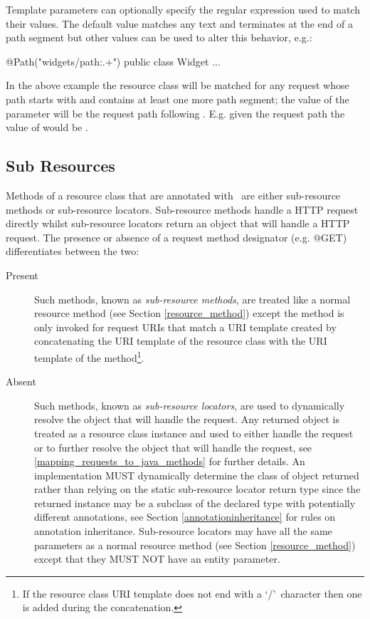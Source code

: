 Template parameters can optionally specify the regular expression used to match their values. The default value matches any text and terminates at the end of a path segment but other values can be used to alter this behavior, e.g.:

\begin{listing}{1}
@Path("widgets/{path:.+}")
public class Widget {
  ...
}\end{listing}

In the above example the  resource class will be matched for any request whose path starts with  and contains at least one more path segment; the value of the  parameter will be the request path following . E.g. given the request path  the value of  would be .

\subsection{Sub Resources}
\label{sub_resources}

Methods of a resource class that are annotated with \Path\ are either sub-resource methods or sub-resource locators. Sub-resource methods handle a HTTP request directly whilst sub-resource locators return an object that will handle a HTTP request. The presence or absence of a request method designator (e.g. @GET) differentiates between the two:

\begin{description}
\item[Present] Such methods, known as {\em sub-resource methods}, are treated like a normal resource method (see Section \ref{resource_method}) except the method is only invoked for request URIs that match a URI template created by concatenating the URI template of the resource class with the URI template of the method\footnote{If the resource class URI template does not end with a \lq/\rq\ character then one is added during the concatenation.}.
\item[Absent] Such methods, known as {\em sub-resource locators}, are used to dynamically resolve the object that will handle the request. Any returned object is treated as a resource class instance and used to either handle the request or to further resolve the object that will handle the request, see \ref{mapping_requests_to_java_methods} for further details. An implementation MUST dynamically determine the class of object returned rather than relying on the static sub-resource locator return type since the returned instance may be a subclass of the declared type with potentially different annotations, see Section \ref{annotationinheritance} for rules on annotation inheritance. Sub-resource locators may have all the same parameters as a normal resource method (see Section \ref{resource_method}) except that they MUST NOT have an entity parameter. 
\end{description}

